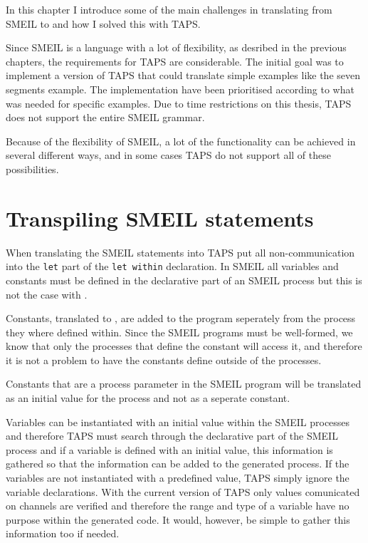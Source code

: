 In this chapter I introduce some of the main challenges in translating from SMEIL to \cspm{} and how I solved this with TAPS.

Since SMEIL is a language with a lot of flexibility, as desribed in the previous chapters, the requirements for TAPS are considerable. The initial goal was to implement a version of TAPS that could translate simple examples like the seven segments example. The implementation have been prioritised according to what was needed for specific examples. Due to time restrictions on this thesis, TAPS does not support the entire SMEIL grammar.

Because of the flexibility of SMEIL, a lot of the functionality can be achieved in several different ways, and in some cases TAPS do not support all of these possibilities.
\section{Transpiling SMEIL statements}
When translating the SMEIL statements into \cspm{} TAPS put all non-communication into the \texttt{let} part of the \texttt{let within} declaration. In SMEIL all variables and constants must be defined in the declarative part of an SMEIL process but this is not the case with \cspm{}.

Constants, translated to \cspm{}, are added to the \cspm{} program seperately from the process they where defined within. Since the SMEIL programs must be well-formed, we know that only the processes that define the constant will access it, and therefore it is not a problem to have the constants define outside of the processes.

Constants that are a process parameter in the SMEIL program will be translated as an initial value for the process and not as a seperate \cspm{} constant.

Variables can be instantiated with an initial value within the SMEIL processes and therefore TAPS must search through the declarative part of the SMEIL process and if a variable is defined with an initial value, this information is gathered so that the information can be added to the generated \cspm{} process. If the variables are not instantiated with a predefined value, TAPS simply ignore the variable declarations. With the current version of TAPS only values comunicated on channels are verified and therefore the range and type of a variable have no purpose within the generated \cspm{} code. It would, however, be simple to gather this information too if needed.\\

